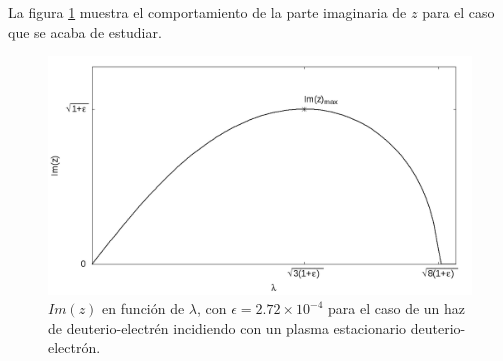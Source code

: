 \documentclass[../tesis_main_file.tex]{subfiles}
\begin{document}
La figura \ref{fig:d-d} muestra el comportamiento de la parte imaginaria de $z$ para el caso que se acaba de estudiar.
\begin{figure}
\includegraphics[height=0.3\paperheight]{grafica-d-d-reposo}
\caption{$Im(z)$ en función de $\lambda$, con $\epsilon = 2.72 \times 10^{-4}$ para el caso de un haz de deuterio-electrén incidiendo con un plasma estacionario deuterio-electrón.}
\label{fig:d-d}
\end{figure}
\end{document}
